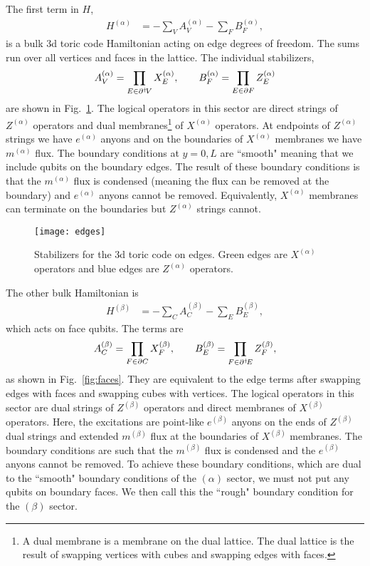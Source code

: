 The first term in $H$,
\begin{align}
H^{(\alpha)} &= -\sum_VA_V^{(\alpha)} - \sum_F B_F^{(\alpha)},
\end{align}
is a bulk 3d toric code Hamiltonian acting on edge degrees of freedom. The sums run over all vertices and faces in the lattice. The individual stabilizers,  
\begin{align}
A_V^{(\alpha)} = \prod_{E\in\partial^\dagger\! V}X_E^{(\alpha)},\qquad B_F^{(\alpha)} = \prod_{E\in\partial F} Z_E^{(\alpha)}
\end{align}
are shown in Fig.~\ref{fig:edges}.  The logical operators in this sector are direct strings of $Z^{(\alpha)}$ operators and dual membranes\footnote{A dual membrane is a membrane on the dual lattice. The dual lattice is the result of swapping vertices with cubes and swapping edges with faces.} of $X^{(\alpha)}$ operators. At endpoints of $Z^{(\alpha)}$ strings we have $e^{(\alpha)}$ anyons and on the boundaries of $X^{(\alpha)}$ membranes we have $m^{(\alpha)}$ flux. The boundary conditions at $y=0,L$ are ``smooth" meaning that we include qubits on the boundary edges. The result of these boundary conditions is that the $m^{(\alpha)}$ flux is condensed (meaning the flux can be removed at the boundary) and $e^{(\alpha)}$ anyons cannot be removed. Equivalently, $X^{(\alpha)}$ membranes can terminate on the boundaries but $Z^{(\alpha)}$ strings cannot.

\begin{figure}
\centering
\texttt{[image: edges]}
\caption[Stabilizers for the 3d toric code on edges]{Stabilizers for the 3d toric code on edges. Green edges are $X^{(\alpha)}$ operators and blue edges are $Z^{(\alpha)}$ operators.}
\label{fig:edges}
\end{figure}

The other bulk Hamiltonian is 
\begin{align}
H^{(\beta)} &= -\sum_CA_C^{(\beta)} - \sum_E B_E^{(\beta)},
\end{align}
which acts on face qubits. The terms are 
\begin{align}
A_C^{(\beta)} = \prod_{F\in\partial C}X_F^{(\beta)},\qquad B_E^{(\beta)} = \prod_{F\in\partial^\dagger\! E} Z_F^{(\beta)},
\end{align}
as shown in Fig.~\ref{fig:faces}. They are equivalent to the edge terms after swapping edges with faces and swapping cubes with vertices. The logical operators in this sector are dual strings of $Z^{(\beta)}$ operators and direct membranes of $X^{(\beta)}$ operators. Here, the excitations are point-like $e^{(\beta)}$ anyons on the ends of $Z^{(\beta)}$ dual strings and extended $m^{(\beta)}$ flux at the boundaries of $X^{(\beta)}$ membranes. The boundary conditions are such that the $m^{(\beta)}$ flux is condensed and the $e^{(\beta)}$ anyons cannot be removed. To achieve these boundary conditions, which are dual to the ``smooth" boundary conditions of the $(\alpha)$ sector, we must not put any qubits on boundary faces. We then call this the ``rough" boundary condition for the $(\beta)$ sector.

